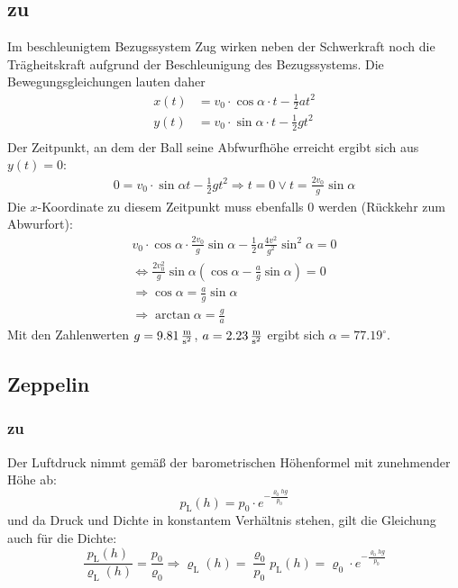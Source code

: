 \documentclass[a4paper]{scrartcl}
\begin{document}
\subsection{zu }
\label{lsg:WurfZug}
Im beschleunigtem Bezugssystem Zug wirken neben der Schwerkraft noch die Trägheitskraft aufgrund der Beschleunigung des Bezugssystems. Die Bewegungsgleichungen lauten daher
\begin{align*}
  x(t) &= v_0 \cdot \cos \alpha \cdot t - \frac{1}{2}at^2\\
  y(t) &= v_0 \cdot \sin \alpha \cdot t - \frac{1}{2}gt^2\\
\end{align*}
Der Zeitpunkt, an dem der Ball seine Abfwurfhöhe erreicht ergibt sich aus $y(t) = 0$:
\begin{align*}
  0 = v_0 \cdot \sin \alpha t - \frac{1}{2}gt^2 \Rightarrow t=0 \lor t = \frac{2v_0}{g}\sin\alpha
\end{align*}
Die $x$-Koordinate zu diesem Zeitpunkt muss ebenfalls 0 werden (Rückkehr zum Abwurfort):
\begin{align*}
  v_0 \cdot \cos \alpha \cdot \frac{2v_0}{g}\sin\alpha - \frac{1}{2}a \frac{4v^2}{g^2}\sin^2\alpha = 0 \\
  \Leftrightarrow \frac{2v_0^2}{g}\sin\alpha \left( \cos\alpha - \frac{a}{g}\sin\alpha \right) = 0 \\
  \Rightarrow \cos \alpha = \frac{a}{g}\sin\alpha \\
  \Rightarrow \arctan \alpha = \frac{g}{a}
\end{align*}
Mit den Zahlenwerten $g=\unit[9.81]{\frac{m}{s^2}}$, $a=\unit[2.23]{\frac{m}{s^2}}$ ergibt sich $\alpha = 77.19^\circ$.


\subsection{Zeppelin}
\subsubsection{zu }
\label{lsg:Zeppelin1}
Der Luftdruck nimmt gemäß der barometrischen Höhenformel mit zunehmender Höhe ab:
\begin{equation*}
  p_\text{L}(h) = p_0 \cdot e^{-\frac{\varrho_0 hg}{p_0}}
\end{equation*}
und da Druck und Dichte in konstantem Verhältnis stehen, gilt die Gleichung auch für die Dichte:
\begin{equation*}
  \frac{p_\text{L}(h)}{\varrho_\text{L}(h)} = \frac{p_0}{\varrho_0} \Rightarrow \varrho_\text{L}(h) = \frac{\varrho_0}{p_0}p_\text{L}(h) = \varrho_0 \cdot e^{-\frac{\varrho_0 hg}{p_0}}
\end{equation*}
\end{document}
